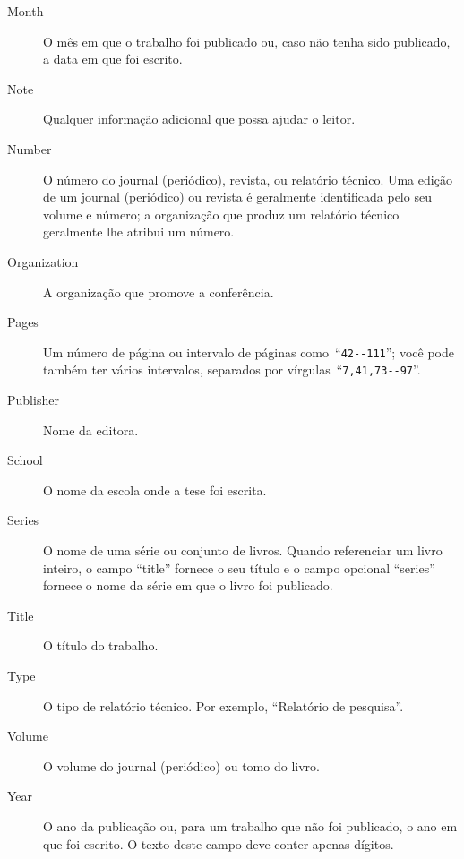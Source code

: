 \documentclass[article,openany]{memoir}
\begin{document}
\begin{description}
\item[Month]

O mês em que o trabalho foi publicado ou, caso não tenha sido
publicado, a data em que foi escrito.

\item[Note]

Qualquer informação adicional que possa ajudar o leitor.

\item[Number]

O número do journal (periódico), revista, ou relatório técnico. Uma
edição de um journal (periódico) ou revista é geralmente identificada
pelo seu volume e número; a organização que produz um relatório
técnico geralmente lhe atribui um número.

\item[Organization]

A organização que promove a conferência.

\item[Pages]

Um número de página ou intervalo de páginas como~``\verb/42--111/'';
você pode também ter vários intervalos, separados por
vírgulas~``\verb/7,41,73--97/''.

\item[Publisher]

Nome da editora.

\item[School]

O nome da escola onde a tese foi escrita.

\item[Series]

O nome de uma série ou conjunto de livros. Quando referenciar um livro
inteiro, o campo ``title'' fornece o seu título e o campo opcional
``series'' fornece o nome da série em que o livro foi publicado.

\item[Title]

O título do trabalho.

\item[Type]

O tipo de relatório técnico. Por exemplo, ``Relatório de pesquisa''.

\item[Volume]

O volume do journal (periódico) ou tomo do livro.

\item[Year]

O ano da publicação ou, para um trabalho que não foi publicado, o ano
em que foi escrito. O texto deste campo deve conter apenas dígitos.
\end{description}
\end{document}
